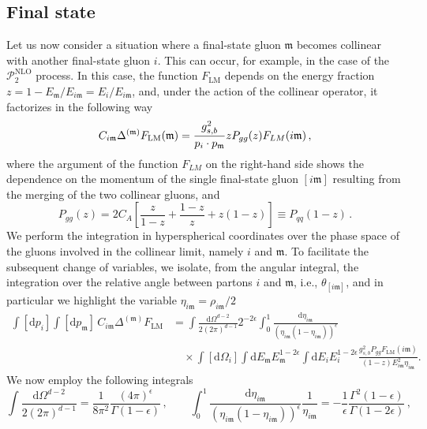 \documentclass[a4paper, 12pt]{book}
\newcommand{\um}{\mathfrak{m}}
\begin{document}
\subsection{Final state}
Let us now consider a situation where a final-state gluon $\um$ becomes collinear with another final-state gluon $i$. This can occur, for example, in the case of the $\mathcal{P}_2^{\mathrm{NLO}}$ process. In this case, the function $F_{\mathrm{LM}}$ depends on the energy fraction $z=1-E_\um/E_{i\um}=E_i/E_{i\um}$, and, under the action of the collinear operator, it factorizes in the following way
\begin{equation}
  C_{i \um} \Delta^{(\um)} F_{\mathrm{LM}} (\um) = \frac{g^2_{s,b}}{p_i \cdot p_\um} z P_{gg}(z) F_{\mathmakebox{LM}}(i\um)\, ,
\end{equation}
where the argument of the function $F_{LM}$ on the right-hand side shows the dependence on the momentum of the single final-state gluon $[i\um]$ resulting from the merging of the two collinear gluons, and
\begin{equation}
  P_{gg}(z)= 2C_A \left[ \frac{z}{1-z}+\frac{1-z}{z}+z(1-z)\right] \equiv P_{qq}(1-z) \, .
\end{equation}
We perform the integration in hyperspherical coordinates over the phase space of the gluons involved in the collinear limit, namely $i$ and $\um$. To facilitate the subsequent change of variables, we isolate, from the angular integral, the integration over the relative angle between partons $i$ and $\um$, i.e., $\theta_{[i\um]}$, and in particular we highlight the variable $\eta_{i\um}=\rho_{i\um}/2$
\begin{align}
  \int [\mathrm{d}p_i] \int [\mathrm{d}p_\um] \, C_{i\um} \Delta^{(\um)} F_{\mathrm{LM}} 
  &= \int \frac{\mathrm{d}\Omega^{d-2}}{2(2\pi)^{d-1}} 2^{-2\epsilon} \int_0^1 \frac{\mathrm{d}\eta_{i\um}}{(\eta_{i\um}(1-\eta_{i\um}))^{\epsilon}} \nonumber \\
  &\quad \times \int [\mathrm{d}\Omega_i] \int \mathrm{d}E_\um E_\um^{1-2\epsilon} \int \mathrm{d}E_i E_i^{1-2\epsilon} 
  \frac{g_{s,b}^2 P_{gg} F_{\mathrm{LM}} (i\um) }{(1-z) E_{i\um}^{2}\eta_{i\um}} .
\end{align}
We now employ the following integrals
\begin{equation}
  \int \frac{\mathrm{d}\Omega^{d-2}}{2(2\pi)^{d-1}} = \frac{1}{8\pi^2} \frac{(4\pi)^{\epsilon}}{\Gamma(1-\epsilon)} \, , \qquad \int_0^1 \frac{\mathrm{d}\eta_{i\um}}{(\eta_{i\um}(1-\eta_{i\um}))^{\epsilon}} \frac{1}{\eta_{i\um}} = - \frac{1}{\epsilon} \frac{\Gamma^2(1-\epsilon)}{\Gamma(1-2\epsilon)} \, , 
\end{equation}
\end{document}
